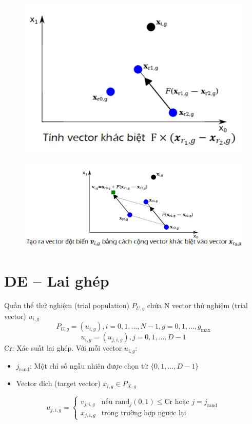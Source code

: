 \documentclass{book}
\begin{document}
\begin{figure}[H]
    \centering
    \includegraphics[width=0.75\linewidth]{images/GA-3_4.png}
\end{figure}

\begin{figure}[H]
    \centering
    \includegraphics[width=1\linewidth]{images/GA-3_5.png}
\end{figure}

\section{DE – Lai ghép}

Quần thể thử nghiệm (trial population) $P_{U,g}$ chứa N vector thử nghiệm (trial vector) $u_{i,g}$
$$ P_{U,g} = (u_{i,g}), i = 0,1, \dots, N-1, g = 0,1, \dots, g_{\max} $$
$$ u_{i,g} = (u_{j,i,g}), j = 0,1, \dots, D-1 $$
Cr: Xác suất lai ghép. Với mỗi vector $u_{i,g}$:
\begin{itemize}
    \item $j_{\text{rand}}$: Một chỉ số ngẫu nhiên được chọn từ $\{0,1, \dots, D-1\}$
    \item Vector đích (target vector) $x_{i,g} \in P_{X,g}$
\end{itemize}

$$ u_{j,i,g} = \begin{cases}
v_{j,i,g} & \text{nếu rand}_j(0,1) \le \text{Cr hoặc } j = j_{\text{rand}} \\
x_{j,i,g} & \text{trong trường hợp ngược lại}
\end{cases} $$
\end{document}
